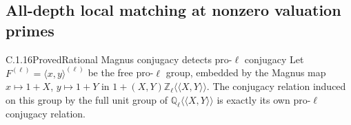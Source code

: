\subsection{All-depth local matching at nonzero valuation primes}
\label{sec:ghost-local-rigidity}

\begin{result}{C.1.16}{Proved}{Rational Magnus conjugacy detects pro-\(\ell\) conjugacy}
\label{lem:ghost-magnus-conjugacy}
Let \(F^{(\ell)}=\langle x,y\rangle^{(\ell)}\) be the
free pro-\(\ell\) group, embedded by the Magnus map
\(x\mapsto1+X\), \(y\mapsto1+Y\) in
\(1+(X,Y)\mathbb Z_\ell\langle\!\langle X,Y\rangle\!\rangle\).
The conjugacy relation induced on this group by the full
unit group of
\(\mathbb Q_\ell\langle\!\langle X,Y\rangle\!\rangle\)
is exactly its own pro-\(\ell\) conjugacy relation.
\end{result}
